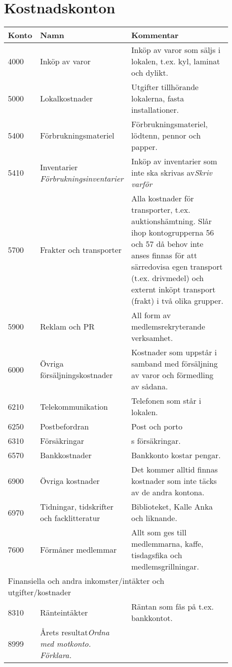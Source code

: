 \section{Kostnadskonton}
\begin{minipage}{\fullwidthlength}
	\begin{longtable}[l]{l p{0.4\linewidth} p{0.5\linewidth}}
		Konto	&	Namn								& Kommentar \\ \toprule \endhead
		4000	&	Inköp av varor						& Inköp av varor som säljs i lokalen, t.ex. kyl, laminat och dylikt.\\
		5000	&	Lokalkostnader						& Utgifter tillhörande lokalerna, fasta installationer.\\
		5400	&	Förbrukningsmateriel				& Förbrukningsmateriel, lödtenn, pennor och papper.\\
		5410	&	Inventarier \newline \emph{Förbrukningsinventarier} & Inköp av inventarier som inte ska skrivas av\emph{Skriv varför}\\
		5700	&	Frakter och transporter				& Alla kostnader för transporter, t.ex. auktionshämtning. Slår ihop kontogrupperna 56 och 57 då behov inte anses finnas för att särredovisa egen transport (t.ex. drivmedel) och externt inköpt transport (frakt) i två olika grupper.\\
		5900	&	Reklam och PR						& All form av medlemsrekryterande verksamhet.\\
		6000	&	Övriga försäljningskostnader		& Kostnader som uppstår i samband med försäljning av varor och förmedling av sådana.\\
		6210	&	Telekommunikation					& Telefonen som står i lokalen.\\
		6250	&	Postbefordran						& Post och porto\\
		6310	&	Försäkringar						& \acr{Eta}s försäkringar.\\
		6570	&	Bankkostnader						& Bankkonto kostar pengar.\\
		6900	&	Övriga kostnader					& Det kommer alltid finnas kostnader som inte täcks av de andra kontona.\\
		6970	&	Tidningar, tidskrifter och facklitteratur & Biblioteket, Kalle Anka och liknande.\\
		7600	&	Förmåner medlemmar					& Allt som ges till medlemmarna, kaffe, tisdagsfika och medlemsgrillningar.\\
		\multicolumn{3}{l}{Finansiella och andra inkomster/intäkter och utgifter/kostnader}\\
		8310	&	Ränteintäkter						& Räntan som fås på t.ex. bankkontot.\\
		8999	&	Årets resultat\emph{Ordna med motkonto. Förklara.}\\
	\end{longtable}
\end{minipage}